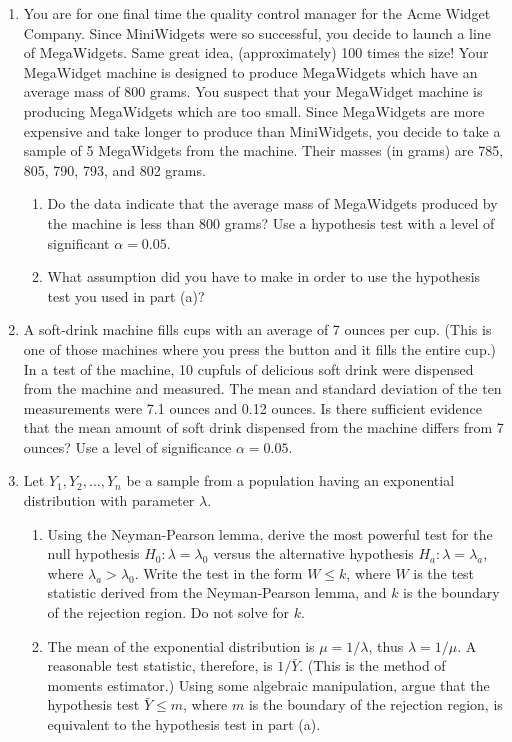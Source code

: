 \documentclass[12pt]{article}
\begin{document}
\begin{enumerate}
\item You are for one final time the quality control manager for the Acme Widget Company. Since MiniWidgets were so successful, you decide to launch a line of MegaWidgets. Same great idea, (approximately) 100 times the size! Your MegaWidget machine is designed to produce MegaWidgets which have an average mass of 800 grams. You suspect that your MegaWidget machine is producing MegaWidgets which are too small. Since MegaWidgets are more expensive and take longer to produce than MiniWidgets, you decide to take a sample of 5 MegaWidgets from the machine. Their masses (in grams) are 785, 805, 790, 793, and 802 grams.
\begin{enumerate}
\item Do the data indicate that the average mass of MegaWidgets produced by the machine is less than 800 grams? Use a hypothesis test with a level of significant $\alpha = 0.05$.
\item What assumption did you have to make in order to use the hypothesis test you used in part (a)?
\end{enumerate}

\item A soft-drink machine fills cups with an average of 7 ounces per cup. (This is one of those machines where you press the button and it fills the entire cup.) In a test of the machine, 10 cupfuls of delicious soft drink were dispensed from the machine and measured. The mean and standard deviation of the ten measurements were 7.1 ounces and 0.12 ounces. Is there sufficient evidence that the mean amount of soft drink dispensed from the machine differs from 7 ounces? Use a level of significance $\alpha = 0.05$.

\item Let $Y_1, Y_2, \dots, Y_n$ be a sample from a population having an exponential distribution with parameter $\lambda$.
\begin{enumerate}
\item Using the Neyman-Pearson lemma, derive the most powerful test for the null hypothesis $H_0: \lambda = \lambda_0$ versus the alternative hypothesis $H_a: \lambda = \lambda_a$, where $\lambda_a > \lambda_0$. Write the test in the form $W \leq k$, where $W$ is the test statistic derived from the Neyman-Pearson lemma, and $k$ is the boundary of the rejection region. Do not solve for $k$.
\item The mean of the exponential distribution is $\mu = 1 / \lambda$, thus $\lambda = 1 / \mu$. A reasonable test statistic, therefore, is $1 / \bar{Y}$. (This is the method of moments estimator.) Using some algebraic manipulation, argue that the hypothesis test $\bar{Y} \leq m$, where $m$ is the boundary of the rejection region, is equivalent to the hypothesis test in part (a).
\end{enumerate}


\end{enumerate}
\end{document}
